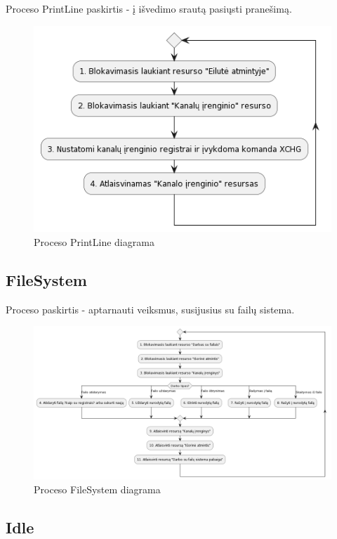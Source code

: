 \documentclass{VUMIFInfKursinis}
\begin{document}
Proceso PrintLine paskirtis - į išvedimo srautą pasiųsti pranešimą.

\begin{figure}[H]
	\centering	
	\includegraphics[scale=0.65]{img/PrintLine}
	\caption{Proceso PrintLine diagrama}   %
	\label{img:PrintLine}
\end{figure}

\subsection{FileSystem}

Proceso paskirtis - aptarnauti veiksmus, susijusius su failų sistema.

\begin{figure}[H]
	\centering	
	\includegraphics[scale=0.35]{img/FileSystem}
	\caption{Proceso FileSystem diagrama}   %
	\label{img:FileSystem}
\end{figure}

\subsection{Idle}
\end{document}
